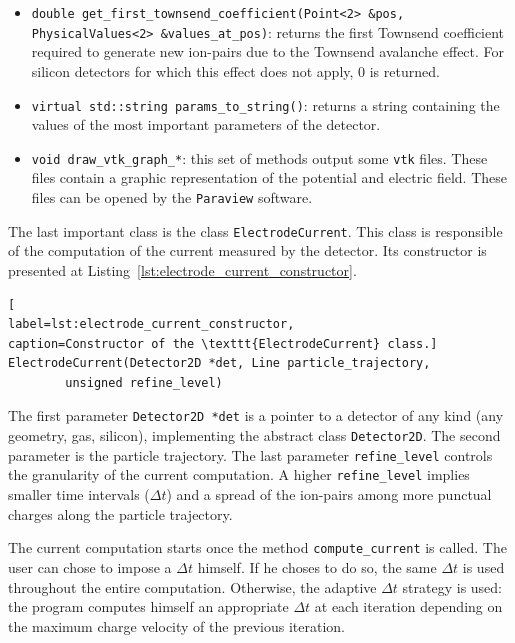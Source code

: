 \documentclass[11pt]{article}
\begin{document}
\begin{itemize}
			\item \lstinline{double get_first_townsend_coefficient(Point<2> &pos, PhysicalValues<2> &values_at_pos)}:
			returns the first Townsend coefficient required to generate new ion-pairs due
			to the Townsend avalanche effect. For silicon detectors for which this effect
			does not apply, 0 is returned.

			\item \lstinline{virtual std::string params_to_string()}: returns a string
			containing the values of the most important parameters of the detector.

			\item \lstinline{void draw_vtk_graph_*}: this set of methods output some \texttt{vtk}
			files. These files contain a graphic representation of the potential and
			electric field. These files can be opened by the \texttt{Paraview} software.
		\end{itemize}

		The last important class is the class \texttt{ElectrodeCurrent}. This class
		is responsible of the computation of the current measured by the detector. Its
		constructor is presented at Listing~\ref{lst:electrode_current_constructor}.
		\newline

		\begin{lstlisting}[
label=lst:electrode_current_constructor,
caption=Constructor of the \texttt{ElectrodeCurrent} class.]
ElectrodeCurrent(Detector2D *det, Line particle_trajectory,
		unsigned refine_level)
		\end{lstlisting}

		The first parameter \texttt{Detector2D *det} is a pointer to a detector of
		any kind (any geometry, gas, silicon), implementing the abstract class \texttt{Detector2D}.
		The second parameter is the particle trajectory. The last parameter \texttt{refine\_level}
		controls the granularity of the current computation. A higher \texttt{refine\_level}
		implies smaller time intervals ($\Delta t$) and a spread of the ion-pairs among
		more punctual charges along the particle trajectory.

		The current computation starts once the method \texttt{compute\_current} is called.
		The user can chose to impose a $\Delta t$ himself. If he choses to do so, the
		same $\Delta t$ is used throughout the entire computation. Otherwise,
		the adaptive $\Delta t$ strategy is used: the program computes himself an
		appropriate $\Delta t$ at each iteration depending on the maximum charge velocity
		of the previous iteration.
\end{document}
